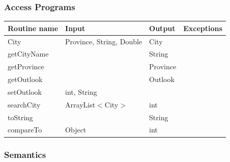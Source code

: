 \documentclass[12pt,fleqn]{article}
\begin{document}
\subsubsection* {Access Programs}
\begin{tabular}{| l | l | l | l |}
\hline
\textbf{Routine name} & \textbf{Input} & \textbf{Output} & \textbf{Exceptions}\\
\hline
City & Province, String, Double & City & ~\\
\hline
getCityName & ~ & String & ~\\
\hline
getProvince & ~ & Province & ~\\
\hline
getOutlook & ~ & Outlook & ~\\
\hline
setOutlook & int, String & ~ & ~\\
\hline
searchCity & ArrayList$<$City$>$ & int & ~\\
\hline
toString & ~ & String & ~\\
\hline
compareTo & Object & int & ~\\
\hline
\end{tabular}

\subsubsection*{Semantics}
\end{document}
